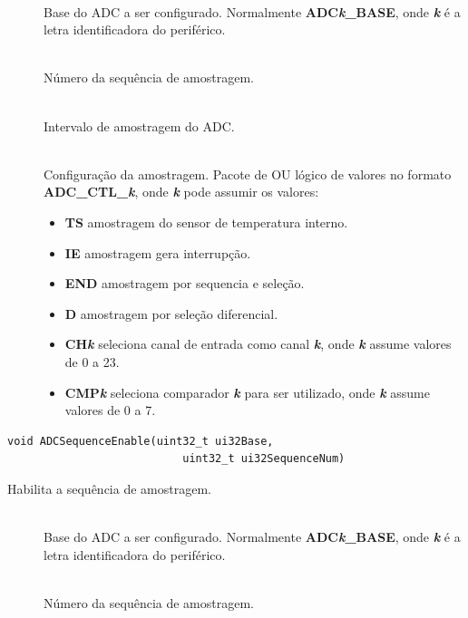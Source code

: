 \begin{description}
	\item []\hfill \\
	Base do ADC a ser configurado. Normalmente \textbf{ADC\emph{k}\_BASE}, onde \textbf{\emph{k}} é a letra identificadora do periférico.
	
	\item []\hfill \\
	Número da sequência de amostragem.
	
	\item []\hfill \\
	Intervalo de amostragem do ADC.
	
	\item []\hfill \\
	Configuração da amostragem. Pacote de OU lógico de valores no formato \textbf{ADC\_CTL\_\emph{k}}, onde \textbf{\emph{k}} pode assumir os valores:
	\begin{itemize}
		\item \textbf{TS} amostragem do sensor de temperatura interno.
		\item \textbf{IE} amostragem gera interrupção.
		\item \textbf{END} amostragem por sequencia e seleção.
		\item \textbf{D} amostragem por seleção diferencial.
		\item \textbf{CH\emph{k}} seleciona canal de entrada como canal \textbf{\emph{k}}, onde \textbf{\emph{k}} assume valores de 0 a 23.
		\item \textbf{CMP\emph{k}} seleciona comparador \textbf{\emph{k}} para ser utilizado, onde \textbf{\emph{k}} assume valores de 0 a 7.
	\end{itemize}
\end{description}

\begin{lstlisting}[style=funcao]
	void ADCSequenceEnable(uint32_t ui32Base,
						   uint32_t ui32SequenceNum)
\end{lstlisting}

Habilita a sequência de amostragem.

\begin{description}
	\item []\hfill \\
	Base do ADC a ser configurado. Normalmente \textbf{ADC\emph{k}\_BASE}, onde \textbf{\emph{k}} é a letra identificadora do periférico.
	
	\item []\hfill \\
	Número da sequência de amostragem.
\end{description}

